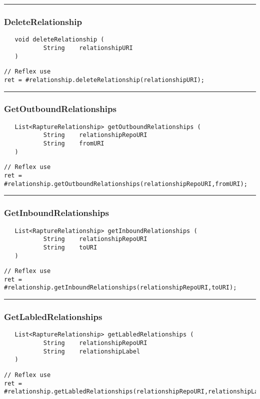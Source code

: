 \rule{15cm}{2pt}
\subsubsection{DeleteRelationship}
\label{Api:DeleteRelationship}
\begin{verbatim}
   void deleteRelationship (
           String    relationshipURI
   )
\end{verbatim}
\begin{lstlisting}[language=reflex]
// Reflex use
ret = #relationship.deleteRelationship(relationshipURI);
\end{lstlisting}



\rule{15cm}{2pt}
\subsubsection{GetOutboundRelationships}
\label{Api:GetOutboundRelationships}
\begin{verbatim}
   List<RaptureRelationship> getOutboundRelationships (
           String    relationshipRepoURI
           String    fromURI
   )
\end{verbatim}
\begin{lstlisting}[language=reflex]
// Reflex use
ret = #relationship.getOutboundRelationships(relationshipRepoURI,fromURI);
\end{lstlisting}



\rule{15cm}{2pt}
\subsubsection{GetInboundRelationships}
\label{Api:GetInboundRelationships}
\begin{verbatim}
   List<RaptureRelationship> getInboundRelationships (
           String    relationshipRepoURI
           String    toURI
   )
\end{verbatim}
\begin{lstlisting}[language=reflex]
// Reflex use
ret = #relationship.getInboundRelationships(relationshipRepoURI,toURI);
\end{lstlisting}



\rule{15cm}{2pt}
\subsubsection{GetLabledRelationships}
\label{Api:GetLabledRelationships}
\begin{verbatim}
   List<RaptureRelationship> getLabledRelationships (
           String    relationshipRepoURI
           String    relationshipLabel
   )
\end{verbatim}
\begin{lstlisting}[language=reflex]
// Reflex use
ret = #relationship.getLabledRelationships(relationshipRepoURI,relationshipLabel);
\end{lstlisting}



